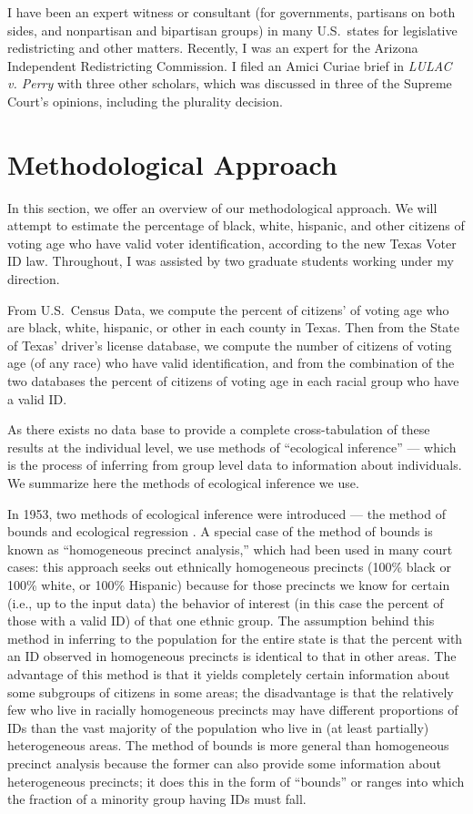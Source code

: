 \documentclass[12pt]{article}
\begin{document}
I have been an expert witness or consultant (for governments,
partisans on both sides, and nonpartisan and bipartisan groups) in
many U.S.\ states for legislative redistricting and other matters.
Recently, I was an expert for the Arizona Independent Redistricting
Commission.  I filed an Amici Curiae brief in \emph{LULAC v. Perry}
with three other scholars, which was discussed in three of the Supreme
Court's opinions, including the plurality decision.

\section{Methodological Approach}\label{s:methods}

In this section, we offer an overview of our methodological approach.
We will attempt to estimate the percentage of black, white, hispanic,
and other citizens of voting age who have valid voter identification,
according to the new Texas Voter ID law.  Throughout, I was assisted
by two graduate students working under my direction.

From U.S.\ Census Data, we compute the percent of citizens' of voting
age who are black, white, hispanic, or other in each county in
Texas.  Then from the State of Texas' driver's license database, we
compute the number of citizens of voting age (of any race) who have
valid identification, and from the combination of the two databases
the percent of citizens of voting age in each racial group who have a valid ID.  

As there exists no data base to provide a complete cross-tabulation of
these results at the individual level, we use methods of ``ecological
inference'' --- which is the process of inferring from group level
data to information about individuals.  We summarize here the methods
of ecological inference we use.

In 1953, two methods of ecological inference were introduced --- the
method of bounds \citep{DunDav53} and ecological regression
\citep{Goodman53}. A special case of the method of bounds is known as
``homogeneous precinct analysis,'' which had been used in many court
cases: this approach seeks out ethnically homogeneous precincts (100\%
black or 100\% white, or 100\% Hispanic) because for those precincts
we know for certain (i.e., up to the input data) the behavior of
interest (in this case the percent of those with a valid ID) of that
one ethnic group.  The assumption behind this method in inferring to
the population for the entire state is that the percent with an ID
observed in homogeneous precincts is identical to that in other areas.
The advantage of this method is that it yields completely certain
information about some subgroups of citizens in some areas; the
disadvantage is that the relatively few who live in racially
homogeneous precincts may have different proportions of IDs
than the vast majority of the population who live in (at least
partially) heterogeneous areas.  The method of bounds is more general
than homogeneous precinct analysis because the former can also provide
some information about heterogeneous precincts; it does this in the
form of ``bounds'' or ranges into which the fraction of a minority
group having IDs must fall.
\end{document}
